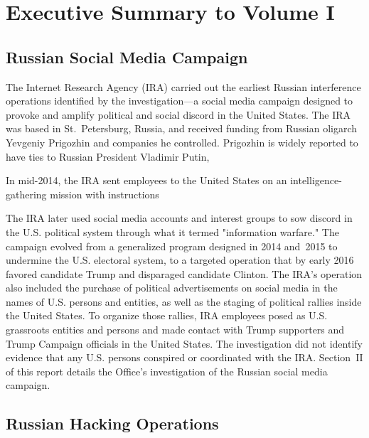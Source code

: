 \section*{Executive Summary to Volume I}
\label{sec:executive-1}

\subsection*{Russian Social Media Campaign}

The Internet Research Agency (IRA) carried out the earliest Russian interference operations identified by the investigation---a social media campaign designed to provoke and amplify political and social discord in the United States.
The IRA was based in St.~Petersburg, Russia, and received funding from Russian oligarch Yevgeniy Prigozhin and companies he controlled.
Prigozhin is widely reported to have ties to Russian President Vladimir Putin, 

In mid-2014, the IRA sent employees to the United States on an intelligence-gathering mission with instructions 

The IRA later used social media accounts and interest groups to sow discord in the U.S. political system through what it termed "information warfare."
The campaign evolved from a generalized program designed in 2014 and~2015 to undermine the U.S. electoral system, to a targeted operation that by early 2016 favored candidate Trump and disparaged candidate Clinton.
The IRA's operation also included the purchase of political advertisements on social media in the names of U.S. persons and entities, as well as the staging of political rallies inside the United States.
To organize those rallies, IRA employees posed as U.S. grassroots entities and persons and made contact with Trump supporters and Trump Campaign officials in the United States.
The investigation did not identify evidence that any U.S. persons conspired or coordinated with the IRA\null.
Section~II of this report details the Office's investigation of the Russian social media campaign.

\subsection*{Russian Hacking Operations}

